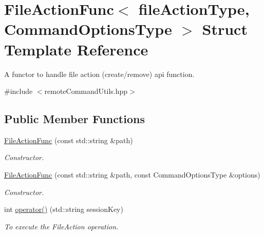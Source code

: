 \hypertarget{structFileActionFunc}{
\section{FileActionFunc$<$ fileActionType, CommandOptionsType $>$ Struct Template Reference}
\label{structFileActionFunc}
}


A functor to handle file action (create/remove) api function.  




{\ttfamily \#include $<$remoteCommandUtils.hpp$>$}

\subsection*{Public Member Functions}
\begin{DoxyCompactItemize}
\item 
\hyperlink{structFileActionFunc_a899ef8d7659ae6c83c958b71b939c0fb}{FileActionFunc} (const std::string \&path)
\begin{DoxyCompactList}\small\item\em Constructor. \item\end{DoxyCompactList}\item 
\hyperlink{structFileActionFunc_af9248de6d02d23b2e11ae0777f052521}{FileActionFunc} (const std::string \&path, const CommandOptionsType \&options)
\begin{DoxyCompactList}\small\item\em Constructor. \item\end{DoxyCompactList}\item 
int \hyperlink{structFileActionFunc_aeae506f5a4b71fcfc554a8492d86a52a}{operator()} (std::string sessionKey)
\begin{DoxyCompactList}\small\item\em To execute the FileAction operation. \item\end{DoxyCompactList}\end{DoxyCompactItemize}

